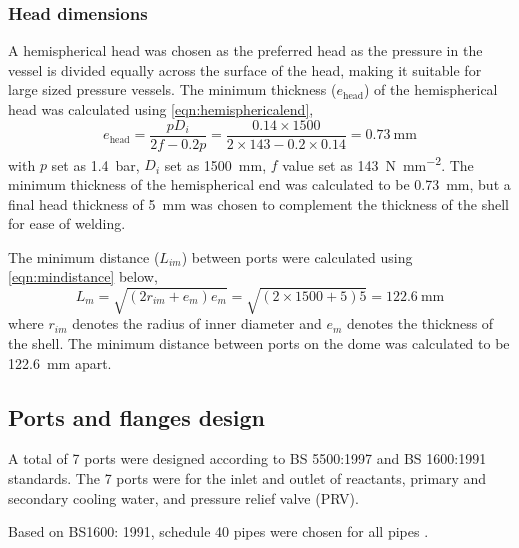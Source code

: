 \subsubsection{Head dimensions}
A hemispherical head was chosen as the preferred head as the pressure in the vessel is divided equally across the surface of the head, making it suitable for large sized pressure vessels. The minimum thickness ($e_\mathrm{head}$) of the hemispherical head was calculated using \cref{eqn:hemisphericalend},
\begin{equation}
    e_\mathrm{head} = \frac{pD_i}{2f-0.2p} = \frac{0.14 \times 1500}{2 \times 143 - 0.2 \times 0.14} = \SI{0.73}{\mm}
    \label{eqn:hemisphericalend}
\end{equation}
with $p$ set as \SI{1.4}{\bar}, $D_i$ set as \SI{1500}{\milli \metre}, $f$ value set as \SI{143}{\N\per\square\mm}.  The minimum thickness of the hemispherical end was calculated to be \SI{0.73}{\milli \metre}, but a final head thickness of \SI{5}{\milli \metre} was chosen to complement the thickness of the shell for ease of welding. 

The minimum distance ($L_{im}$) between ports were calculated using \cref{eqn:mindistance} below,
\begin{equation}
    L_m = \sqrt{(2r_{im}+e_{m})e_m} = \sqrt{(2 \times 1500 + 5)5} = \SI{122.6}{\mm}
    \label{eqn:mindistance}
\end{equation}
where $r_{im}$ denotes the radius of inner diameter and $e_m$ denotes the thickness of the shell. The minimum distance between ports on the dome was calculated to be \SI{122.6}{\milli \metre} apart. 

\subsection{Ports and flanges design}
A total of 7 ports were designed according to BS 5500:1997 and BS 1600:1991 standards. The 7 ports were for the inlet and outlet of reactants, primary and secondary cooling water, and pressure relief valve (PRV).

Based on BS1600: 1991, schedule 40 pipes were chosen for all pipes \cite{noauthor_dimensions_nodate}. 

